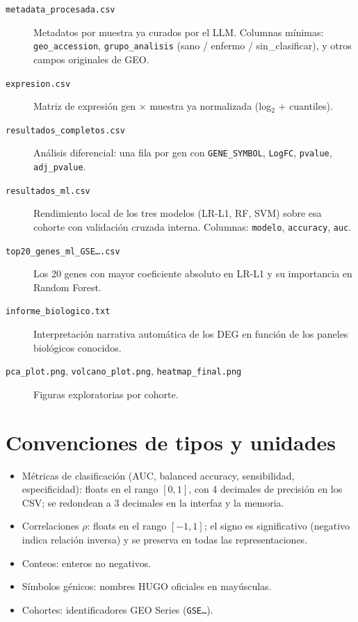 \begin{description}
  \item[\texttt{metadata\_procesada.csv}] Metadatos por muestra ya
  curados por el LLM. Columnas mínimas: \texttt{geo\_accession},
  \texttt{grupo\_analisis} (sano / enfermo / sin\_clasificar), y otros
  campos originales de GEO.

  \item[\texttt{expresion.csv}] Matriz de expresión gen $\times$ muestra
  ya normalizada (log$_2$ + cuantiles).

  \item[\texttt{resultados\_completos.csv}] Análisis diferencial: una
  fila por gen con \texttt{GENE\_SYMBOL}, \texttt{LogFC},
  \texttt{pvalue}, \texttt{adj\_pvalue}.

  \item[\texttt{resultados\_ml.csv}] Rendimiento local de los tres
  modelos (LR-L1, RF, SVM) sobre esa cohorte con validación cruzada
  interna. Columnas: \texttt{modelo}, \texttt{accuracy}, \texttt{auc}.

  \item[\texttt{top20\_genes\_ml\_GSE\ldots.csv}] Los 20 genes con mayor
  coeficiente absoluto en LR-L1 y su importancia en Random Forest.

  \item[\texttt{informe\_biologico.txt}] Interpretación narrativa
  automática de los DEG en función de los paneles biológicos conocidos.

  \item[\texttt{pca\_plot.png}, \texttt{volcano\_plot.png},
  \texttt{heatmap\_final.png}] Figuras exploratorias por cohorte.
\end{description}

\section*{Convenciones de tipos y unidades}
{}

\begin{itemize}
  \item Métricas de clasificación (AUC, balanced accuracy, sensibilidad,
  especificidad): floats en el rango $[0, 1]$, con 4 decimales de
  precisión en los CSV; se redondean a 3 decimales en la interfaz y la
  memoria.
  \item Correlaciones $\rho$: floats en el rango $[-1, 1]$; el signo es
  significativo (negativo indica relación inversa) y se preserva en
  todas las representaciones.
  \item Conteos: enteros no negativos.
  \item Símbolos génicos: nombres HUGO oficiales en mayúsculas.
  \item Cohortes: identificadores GEO Series (\texttt{GSE\ldots}).
\end{itemize}
